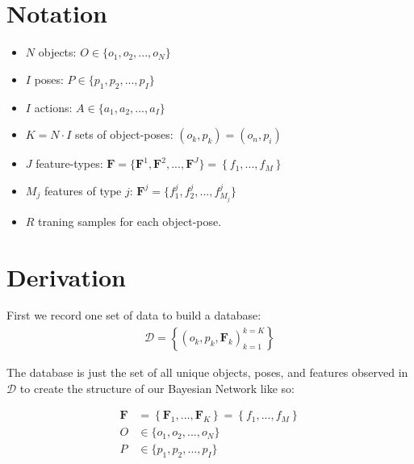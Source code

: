 \documentclass[11pt]{article}
\newcommand{\SetOf}[1]{\mathbf{#1}} %
\newcommand{\Eq}[1]{\begin{align*}#1\end{align*}} %
\newcommand{\cursive}[1]{\mathcal{#1}}
\begin{document}


\section{Notation}
	\begin{itemize}
		\item $N$ objects: $O \in \{o_1,o_2, ..., o_N\}$
		\item $I$ poses: $P \in \{p_1,p_2, ..., p_I\}$
		\item $I$ actions: $A \in \{a_1,a_2, ..., a_I\}$
		\item $K=N\cdot I$ sets of object-poses: $(o_k,p_k) = (o_n,p_i)$
		\item $J$ feature-types: $\SetOf{F} = \{\SetOf{F}^1,\SetOf{F}^2, ..., \SetOf{F}^J\} = \left\{ f_1, ...,  f_M\right\}$
		\item $M_j$ features of type $j$: $\SetOf{F}^j = \{f^j_1,f^j_2, ..., f^j_{M_j}\}$
		\item $R$ traning samples for each object-pose.
	\end{itemize}

\section{Derivation}
	First we record one set of data to build a database:
	\Eq{\cursive{D} = \left\{ \left(o_k,p_k,\SetOf{F}_k\right)^{k=K}_{k=1} \right\}}

	The database is just the set of all unique objects, poses, and features observed in $\cursive{D}$ to create the structure of our Bayesian Network like so:

	\Eq{\SetOf{F} &= \left\{ \SetOf{F}_1, ...,  \SetOf{F}_K\right\} = \left\{ f_1, ...,  f_M\right\}\\
	O &\in \{o_1,o_2, ..., o_N\}\\
	P &\in \{p_1,p_2, ..., p_I\}}


	\begin{center}
	\end{center}
\end{document}
